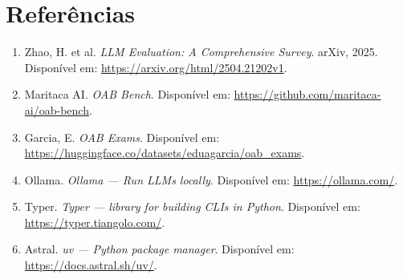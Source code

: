 \documentclass[12pt,a4paper]{article}
\begin{document}
\section{Referências}

\begin{enumerate}[nosep]
  \item Zhao, H. et al. \textit{LLM Evaluation: A Comprehensive Survey}. arXiv, 2025. Disponível em: \url{https://arxiv.org/html/2504.21202v1}.
  \item Maritaca AI. \textit{OAB Bench}. Disponível em: \url{https://github.com/maritaca-ai/oab-bench}.
  \item Garcia, E. \textit{OAB Exams}. Disponível em: \url{https://huggingface.co/datasets/eduagarcia/oab_exams}.
  \item Ollama. \textit{Ollama — Run LLMs locally}. Disponível em: \url{https://ollama.com/}.
  \item Typer. \textit{Typer — library for building CLIs in Python}. Disponível em: \url{https://typer.tiangolo.com/}.
  \item Astral. \textit{uv — Python package manager}. Disponível em: \url{https://docs.astral.sh/uv/}.
\end{enumerate}
\end{document}
